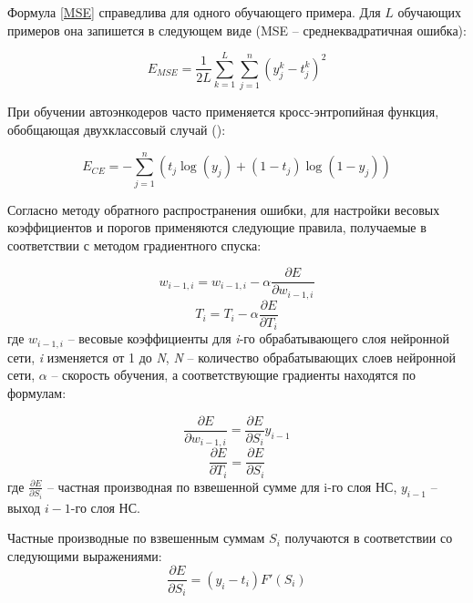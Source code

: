 Формула \ref{MSE} справедлива для одного обучающего примера. Для $L$ обучающих примеров она запишется в следующем виде (MSE -- среднеквадратичная ошибка):

\begin{equation}
	\label{MSE_L}
	E_{MSE} = \frac{1}{2L}\sum_{k=1}^{L}\sum_{j=1}^{n}(y_j^k - t_j^k)^2	
\end{equation}

При обучении автоэнкодеров часто применяется кросс-энтропийная функция, обобщающая двухклассовый случай (\cite{Amaral2013}):

\begin{equation}
	\label{CE}
	E_{CE} = -\sum_{j=1}^n(t_j\log(y_j) + (1-t_j)\log(1-y_j))
\end{equation}

Согласно методу обратного распространения ошибки, для настройки весовых коэффициентов и порогов применяются следующие правила, получаемые в соответствии с методом градиентного спуска:

\begin{equation}
	w_{i-1,i} = w_{i-1, i} - \alpha \frac{\partial E}{\partial w_{i-1, i}}
\end{equation}
\begin{equation}
	T_i = T_i - \alpha \frac{\partial E}{\partial T_i}
\end{equation}
где $w_{i-1,i}$ -- весовые коэффициенты для \textit{i}-го обрабатывающего слоя нейронной сети, \textit{i} изменяется от 1 до \textit{N}, \textit{N} -- количество обрабатывающих слоев нейронной сети, $\alpha$ -- скорость обучения, а соответствующие градиенты находятся по формулам:

\begin{equation}
	\label{weights_delta}
	\frac{\partial E}{\partial w_{i-1, i}} = \frac{\partial E}{\partial S_i} y_{i-1}
\end{equation}
\begin{equation}
	\label{biases_delta}
	\frac{\partial E}{\partial T_i} = \frac{\partial E}{\partial S_i}
\end{equation}
где $\frac{\partial E}{\partial S_i}$ -- частная производная по взвешенной сумме для i-го слоя НС, $y_{i-1}$ -- выход $i-1$-го слоя НС.


Частные производные по взвешенным суммам $S_i$ получаются в соответствии со следующими выражениями:
\begin{equation}
	\label{last_layer_error}
	\frac{\partial E}{\partial S_i} = (y_i - t_i)F'(S_i)
\end{equation}

